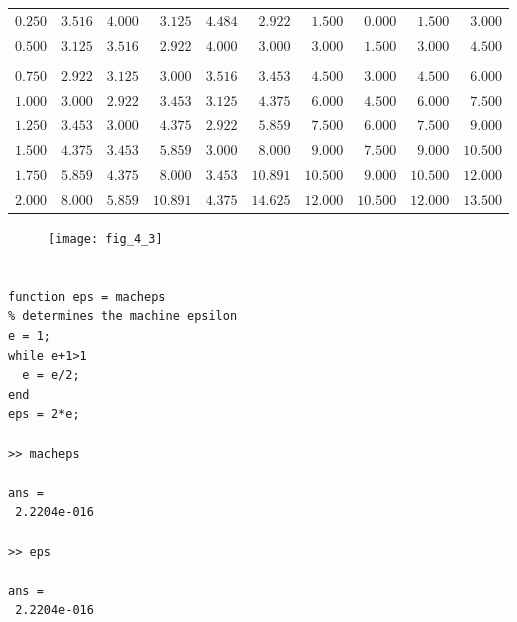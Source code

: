 \documentclass[../main.tex]{subfiles}
\begin{document}
\begin{enumerate}[label=\bfseries(\alph*)]
\begin{tabular}{rrrrrrrrrr}
$0.250$ & $3.516$ & $4.000$ & $3.125$ & $4.484$ & $2.922$ & $1.500$ & $0.000$ & $1.500$ & $3.000$\\
$0.500$ & $3.125$ & $3.516$ & $2.922$ & $4.000$ & $3.000$ & $3.000$ & $1.500$ & $3.000$ & $4.500$\\\\
$0.750$ & $2.922$ & $3.125$ & $3.000$ & $3.516$ & $3.453$ & $4.500$ & $3.000$ & $4.500$ & $6.000$\\
$1.000$ & $3.000$ & $2.922$ & $3.453$ & $3.125$ & $4.375$ & $6.000$ & $4.500$ & $6.000$ & $7.500$\\
$1.250$ & $3.453$ & $3.000$ & $4.375$ & $2.922$ & $5.859$ & $7.500$ & $6.000$ & $7.500$ & $9.000$\\
$1.500$ & $4.375$ & $3.453$ & $5.859$ & $3.000$ & $8.000$ & $9.000$ & $7.500$ & $9.000$ & $10.500$\\
$1.750$ & $5.859$ & $4.375$ & $8.000$ & $3.453$ & $10.891$ & $10.500$ & $9.000$ & $10.500$ & $12.000$\\
$2.000$ & $8.000$ & $5.859$ & $10.891$ & $4.375$ & $14.625$ & $12.000$ & $10.500$ & $12.000$ & $13.500$\\
\end{tabular}
\bigbreak
\begin{figure}[H]\quad\quad\quad\quad\quad\quad\quad\quad\quad
		\texttt{[image: fig\_4\_3]}
		\label{fig:fig_4_3}
	\end{figure}
\bigbreak


\section{}
\begin{lstlisting}[numbers=none]
function eps = macheps
% determines the machine epsilon
e = 1;
while e+1>1
  e = e/2;
end
eps = 2*e;

>> macheps

ans =
 2.2204e-016
 
>> eps

ans =
 2.2204e-016
\end{lstlisting}

\end{enumerate}
\end{document}
